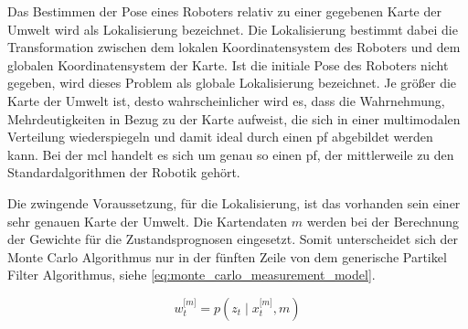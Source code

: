 Das Bestimmen der Pose eines Roboters relativ zu einer gegebenen Karte der Umwelt wird als Lokalisierung bezeichnet. Die Lokalisierung bestimmt dabei die Transformation zwischen dem lokalen Koordinatensystem des Roboters und dem globalen Koordinatensystem der Karte. Ist die initiale Pose des Roboters nicht gegeben, wird dieses Problem als globale Lokalisierung bezeichnet. Je größer die Karte der Umwelt ist, desto wahrscheinlicher wird es, dass die Wahrnehmung, Mehrdeutigkeiten in Bezug zu der Karte aufweist, die sich in einer multimodalen Verteilung wiederspiegeln und damit ideal durch einen \Gls{pf} abgebildet werden kann. Bei der \Gls{mcl} handelt es sich um genau so einen \Gls{pf}, der mittlerweile zu den Standardalgorithmen der Robotik gehört.

Die zwingende Voraussetzung, für die Lokalisierung, ist das vorhanden sein einer sehr genauen Karte der Umwelt. Die Kartendaten $m$ werden bei der Berechnung der Gewichte für die Zustandsprognosen eingesetzt. Somit unterscheidet sich der Monte Carlo Algorithmus nur in der fünften Zeile von dem generische Partikel Filter Algorithmus, siehe \autoref{eq:monte_carlo_measurement_model}. 

\begin{equation}
w^{\lbrack m \rbrack}_t = p(z_t \mid x^{\lbrack m \rbrack}_t, m) \label{eq:monte_carlo_measurement_model}
\end{equation}

%

